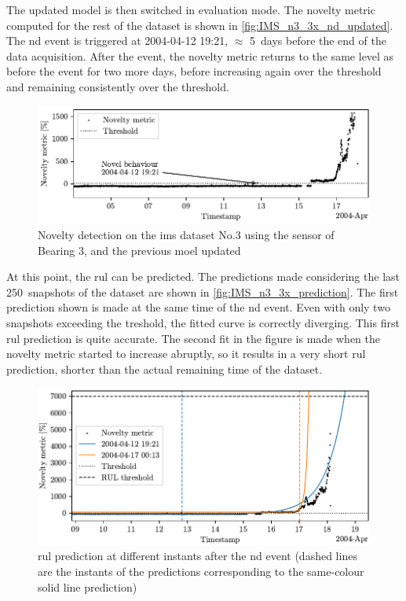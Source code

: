 The updated model is then switched in evaluation mode. The novelty metric computed for the rest of the dataset is shown in \autoref{fig:IMS_n3_3x_nd_updated}. The \gls{nd} event is triggered at 2004-04-12 19:21, $\approx$ 5~days before the end of the data acquisition. After the event, the novelty metric returns to the same level as before the event for two more days, before increasing again over the threshold and remaining consistently over the threshold.

\begin{figure}
    \centering
    \includegraphics[width=\textwidth]{images/IMS/Test03/ND.pdf}
    \caption{Novelty detection on the \gls{ims} dataset No.3 using the sensor of Bearing 3, and the previous moel updated}
    \label{fig:IMS_n3_3x_nd_updated}
\end{figure}

At this point, the \gls{rul} can be predicted. The predictions made considering the last 250~snapshots of the dataset are shown in \autoref{fig:IMS_n3_3x_prediction}. The first prediction shown is made at the same time of the \gls{nd} event. Even with only two snapshots exceeding the treshold, the fitted curve is correctly diverging. This first \gls{rul} prediction is quite accurate. The second fit in the figure is made when the novelty metric started to increase abruptly, so it results in a very short \gls{rul} prediction, shorter than the actual remaining time of the dataset.

\begin{figure}
    \centering
    \includegraphics[width=\textwidth]{images/IMS/Test03/RUL.pdf}
    \caption{\gls{rul} prediction at different instants after the \gls{nd} event (dashed lines are the instants of the predictions corresponding to the same-colour solid line prediction)}
    \label{fig:IMS_n3_3x_prediction}
\end{figure}

